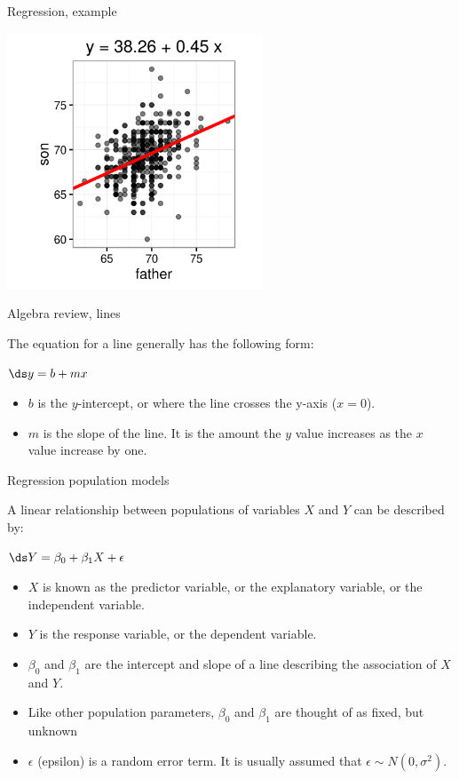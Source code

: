 \documentclass[xcolor=table]{beamer}
\begin{document}
\begin{frame}{Regression, example}

\medskip
{\centering
\includegraphics[width=3in]{../images/ch10_reg_galton}
\par}

\end{frame}

\begin{frame}{Algebra review, lines}
\begin{block}{}
\large
The equation for a line generally has the following form:\\
\smallskip
{\centering \Large
$\ds y = b + mx$
\par}
\begin{itemize}
\item $b$ is the $y$-intercept, or where the line crosses the y-axis ($x=0$).
\item $m$ is the slope of the line. It is the amount the $y$ value increases as the $x$ value increase by one.
\end{itemize}
\end{block}
\end{frame}

\begin{frame}{Regression population models}
\begin{block}{}
\large
A linear relationship between populations of variables $X$ and $Y$ can be described by:\\
\smallskip
{\centering
$\ds Y = \beta_0 + \beta_1 X + \epsilon$
\par}
\smallskip
\begin{itemize}
\pause\item $X$ is known as the predictor variable, or the explanatory variable, or the independent variable.
\pause\item $Y$ is the response variable, or the dependent variable.
\pause\item $\beta_0$ and $\beta_1$ are the intercept and slope of a line describing the association of $X$ and $Y$.
\pause\item Like other population parameters, $\beta_0$ and $\beta_1$ are thought of as fixed, but unknown
\pause\item $\epsilon$ (epsilon) is a random error term. It is usually assumed that $\epsilon \sim N(0, \sigma^2)$.
\end{itemize}
\end{block}
\end{frame}
\end{document}
